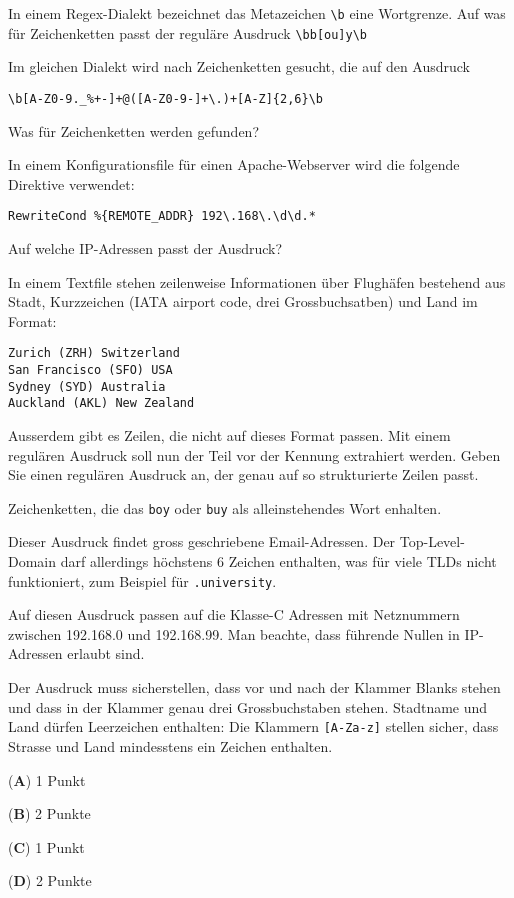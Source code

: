 \begin{teilaufgaben}
\item
In einem Regex-Dialekt bezeichnet das Metazeichen \texttt{\textbackslash{}b}
eine Wortgrenze.
Auf was für Zeichenketten passt der reguläre Ausdruck
\texttt{\textbackslash{}bb[ou]y\textbackslash{}b}
\item
Im gleichen Dialekt wird nach Zeichenketten gesucht, die auf den Ausdruck
\begin{verbatim}
\b[A-Z0-9._%+-]+@([A-Z0-9-]+\.)+[A-Z]{2,6}\b
\end{verbatim}
Was für Zeichenketten werden gefunden?
\item
In einem Konfigurationsfile für einen Apache-Webserver wird die folgende
Direktive verwendet:
\begin{verbatim}
RewriteCond %{REMOTE_ADDR} 192\.168\.\d\d.*
\end{verbatim}
Auf welche IP-Adressen passt der Ausdruck?
\item
In einem Textfile stehen zeilenweise Informationen über Flughäfen bestehend
aus Stadt, Kurzzeichen (IATA airport code, drei Grossbuchsatben) und Land
im Format:
\begin{verbatim}
Zurich (ZRH) Switzerland
San Francisco (SFO) USA
Sydney (SYD) Australia
Auckland (AKL) New Zealand
\end{verbatim}
Ausserdem gibt es Zeilen, die nicht auf dieses Format passen.
Mit einem regulären Ausdruck soll nun der Teil vor der Kennung extrahiert
werden. 
Geben Sie einen regulären Ausdruck an, der genau auf so strukturierte
Zeilen passt.
\end{teilaufgaben}


\begin{loesung}
\begin{teilaufgaben}
\item
Zeichenketten, die das \texttt{boy} oder \texttt{buy} als
alleinstehendes Wort enhalten.
\item
Dieser Ausdruck findet gross geschriebene Email-Adressen.
Der Top-Level-Domain darf allerdings höchstens 6 Zeichen enthalten,
was für viele TLDs nicht funktioniert, zum Beispiel für \texttt{.university}.
\item
Auf diesen Ausdruck passen auf die Klasse-C Adressen mit Netznummern
zwischen 192.168.0 und 192.168.99.
Man beachte, dass führende Nullen in IP-Adressen erlaubt sind.
\item
Der Ausdruck muss sicherstellen, dass vor und nach der Klammer Blanks stehen
und dass in der Klammer genau drei Grossbuchstaben stehen.
Stadtname und Land dürfen Leerzeichen enthalten:
Die Klammern \texttt{[A-Za-z]} stellen sicher, dass Strasse und Land
mindesstens ein Zeichen enthalten.
\end{teilaufgaben}
\end{loesung}

\begin{bewertung}
\begin{teilaufgaben}
\item ({\bf A}) 1 Punkt
\item ({\bf B}) 2 Punkte
\item ({\bf C}) 1 Punkt
\item ({\bf D}) 2 Punkte
\end{teilaufgaben}
\end{bewertung}


